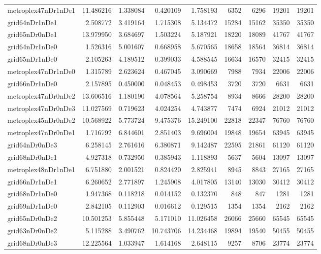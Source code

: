 \begin{longtable}{|l|r|r|r|r|r|r|r|r|}
metroplex47nDr1nDe1 & 11.486216 & 1.338084 & 0.420109 & 1.758193 & 6352 & 6296 & 19201 & 19201 \\
grid64nDr1nDe1 & 2.508772 & 3.419164 & 1.715308 & 5.134472 & 15284 & 15162 & 35350 & 35350 \\
grid65nDr0nDe1 & 13.979950 & 3.684697 & 1.503224 & 5.187921 & 18220 & 18089 & 41767 & 41767 \\
grid64nDr1nDe0 & 1.526316 & 5.001607 & 0.668958 & 5.670565 & 18658 & 18564 & 36814 & 36814 \\
grid65nDr1nDe0 & 2.105263 & 4.189512 & 0.399033 & 4.588545 & 16634 & 16570 & 32415 & 32415 \\
metroplex47nDr1nDe0 & 1.315789 & 2.623624 & 0.467045 & 3.090669 & 7988 & 7934 & 22006 & 22006 \\
grid66nDr1nDe0 & 2.157895 & 0.450000 & 0.048453 & 0.498453 & 3720 & 3720 & 6631 & 6631 \\
metroplex47nDr0nDe2 & 13.606516 & 1.180190 & 4.078564 & 5.258754 & 8934 & 8666 & 28200 & 28200 \\
metroplex47nDr0nDe3 & 11.027569 & 0.719623 & 4.024254 & 4.743877 & 7474 & 6924 & 21012 & 21012 \\
metroplex45nDr0nDe2 & 10.568922 & 5.773724 & 9.475376 & 15.249100 & 22818 & 22347 & 76760 & 76760 \\
metroplex47nDr0nDe1 & 1.716792 & 6.844601 & 2.851403 & 9.696004 & 19848 & 19654 & 63945 & 63945 \\
grid64nDr0nDe3 & 6.258145 & 2.761616 & 6.380871 & 9.142487 & 22595 & 21861 & 61120 & 61120 \\
grid68nDr0nDe1 & 4.927318 & 0.732950 & 0.385943 & 1.118893 & 5637 & 5604 & 13097 & 13097 \\
metroplex48nDr1nDe1 & 6.751880 & 2.001521 & 0.824420 & 2.825941 & 8945 & 8843 & 27165 & 27165 \\
grid66nDr1nDe1 & 6.260652 & 2.771897 & 1.245908 & 4.017805 & 13140 & 13030 & 30412 & 30412 \\
grid68nDr1nDe0 & 1.947368 & 0.118218 & 0.014152 & 0.132370 & 848 & 847 & 1281 & 1281 \\
grid69nDr1nDe0 & 2.842105 & 0.112903 & 0.016612 & 0.129515 & 1354 & 1354 & 2162 & 2162 \\
grid65nDr0nDe2 & 10.501253 & 5.855448 & 5.171010 & 11.026458 & 26066 & 25660 & 65545 & 65545 \\
grid63nDr0nDe2 & 5.115288 & 3.490762 & 10.743706 & 14.234468 & 19894 & 19540 & 50455 & 50455 \\
grid68nDr0nDe3 & 12.225564 & 1.033947 & 1.614168 & 2.648115 & 9257 & 8706 & 23774 & 23774 \\

\end{longtable}
